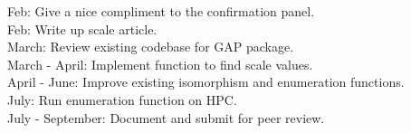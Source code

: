 \documentclass[preview]{standalone}
\begin{document}
Feb: Give a nice compliment to the confirmation panel.\\Feb: Write up scale article.\\March: Review existing codebase for GAP package.\\March - April: Implement function to find scale values.\\April - June: Improve existing isomorphism and enumeration functions.\\July: Run enumeration function on HPC.\\July - September: Document and submit for peer review.\\
\end{document}
